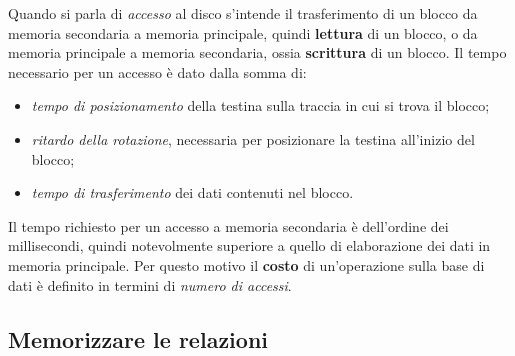 Quando si parla di \emph{accesso} al disco s'intende il trasferimento di un blocco da memoria secondaria 
a memoria principale, quindi \textbf{lettura} di un blocco, o da memoria principale a memoria secondaria, 
ossia \textbf{scrittura} di un blocco. Il tempo necessario per un accesso è dato dalla somma di:
\begin{itemize}
 \item \emph{tempo di posizionamento} della testina sulla traccia in cui si trova il blocco;
 \item \emph{ritardo della rotazione}, necessaria per posizionare la testina all'inizio del blocco;
 \item \emph{tempo di trasferimento} dei dati contenuti nel blocco.
\end{itemize}
Il tempo richiesto per un accesso a memoria secondaria è dell'ordine dei millisecondi, quindi 
notevolmente superiore a quello di elaborazione dei dati in memoria principale. Per questo motivo il 
\textbf{costo} di un'operazione sulla base di dati è definito in termini di \emph{numero di accessi}.

\subsection{Memorizzare le relazioni}

